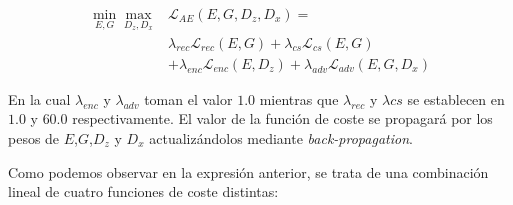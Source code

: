             \begin{align*}
                \min_{E,G} \max_{D_z,D_x} & \mathcal{L}_{AE}(E,G,D_z,D_x) = \\
                & \lambda_{rec} \mathcal{L}_{rec}(E,G) + \lambda_{cs}\mathcal{L}_{cs}(E,G) \\
                & + \lambda_{enc}\mathcal{L}_{enc}(E,D_z)+ \lambda_{adv} \mathcal{L}_{adv}(E,G,D_x)
            \end{align*}

            \noindent En la cual $\lambda_{enc}$ y $\lambda_{adv}$ toman el valor $1.0$ mientras que $\lambda_{rec}$ y $\lambda{cs}$ se establecen en $1.0$ y $60.0$ respectivamente. El valor de la función de coste se propagará por los pesos de $E$,$G$,$D_z$ y $D_x$ actualizándolos mediante \textit{back-propagation}. 

            \medskip

            \noindent Como podemos observar en la expresión anterior, se trata de una combinación lineal de cuatro funciones de coste distintas: 

